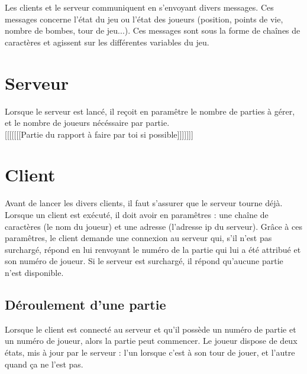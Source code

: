 	Les clients et le serveur communiquent en s'envoyant divers messages. Ces messages concerne l'état du jeu ou l'état des joueurs (position, points de vie, nombre de bombes, tour de jeu...). Ces messages sont sous la forme de chaînes de caractères et agissent sur les différentes variables du jeu.

\section*{Serveur}

Lorsque le serveur est lancé, il reçoit en paramêtre le nombre de parties à gérer, et le nombre de joueurs nécéssaire par partie. \\

[[[[[[[Partie du rapport à faire par toi si possible]]]]]]]

\section*{Client}

Avant de lancer les divers clients, il faut s'assurer que le serveur tourne déjà. Lorsque un client est exécuté, il doit avoir en paramêtres : une chaîne de caractères (le nom du joueur) et une adresse (l'adresse ip du serveur). Grâce à ces paramêtres, le client demande une connexion au serveur qui, s'il n'est pas surchargé, répond en lui renvoyant le numéro de la partie qui lui a été attribué et son numéro de joueur. Si le serveur est surchargé, il répond qu'aucune partie n'est disponible.


\subsection*{Déroulement d'une partie}

Lorsque le client est connecté au serveur et qu'il possède un numéro de partie et un numéro de joueur, alors la partie peut commencer. Le joueur dispose de deux états, mis à jour par le serveur : l'un lorsque c'est à son tour de jouer, et l'autre quand ça ne l'est pas.\\ 

